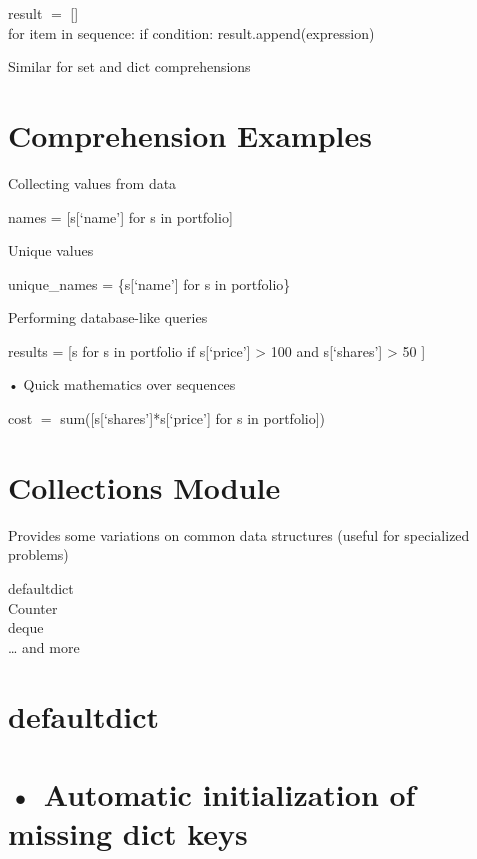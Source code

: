\documentclass[
  letterpaper,
  DIV=11,
  numbers=noendperiod]{scrreprt}
\begin{document}
result \(=\) {[}{]}\\
for item in sequence: if condition: result.append(expression)

Similar for set and dict comprehensions


\chapter{Comprehension Examples}\label{comprehension-examples}

Collecting values from data

names = {[}s{[}`name'{]} for s in portfolio{]}

Unique values

unique\_names = \{s{[}`name'{]} for s in portfolio\}

Performing database-like queries

results = {[}s for s in portfolio if s{[}`price'{]} \textgreater{} 100
and s{[}`shares'{]} \textgreater{} 50 {]}

• Quick mathematics over sequences

cost \(=\) sum({[}s{[}`shares'{]}*s{[}`price'{]} for s in portfolio{]})


\chapter{Collections Module}\label{collections-module}

Provides some variations on common data structures (useful for
specialized problems)

defaultdict\\
Counter\\
deque\\
\ldots{} and more


\chapter{defaultdict}\label{defaultdict}


\chapter{• Automatic initialization of missing dict
keys}\label{automatic-initialization-of-missing-dict-keys}
\end{document}

